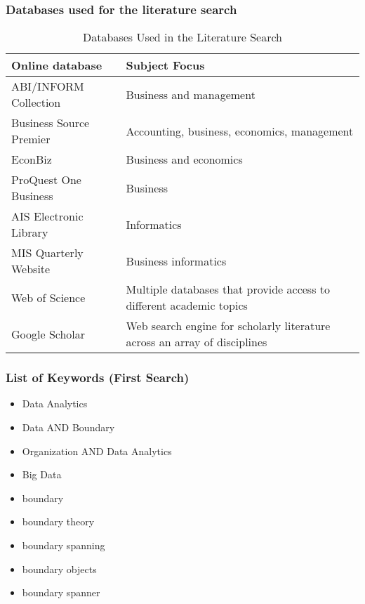\subsubsection*{Databases used for the literature search}

\begin{table}[htbp]
    \centering
    \small
    \begin{tabular}{lL{8cm}}
    \hline
    Online database           & Subject Focus                                                          \\ \hline
    ABI/INFORM Collection     & Business and management                                                \\
    Business Source Premier   & Accounting, business, economics, management                            \\
    EconBiz                   & Business and economics                                                 \\
    ProQuest One Business     & Business                                                               \\
    AIS Electronic Library    & Informatics                                                            \\
    MIS Quarterly Website     & Business informatics                                                   \\
    Web of Science            & Multiple databases that provide access to different academic topics    \\
    Google Scholar            & Web search engine for scholarly literature across an array of disciplines \\ \hline
    \end{tabular}
    \caption{Databases Used in the Literature Search}
    \label{literature_search_db}
    \end{table}
    
\subsubsection*{List of Keywords (First Search)}

\begin{itemize}
    \item Data Analytics
	\item Data AND Boundary
	\item Organization AND Data Analytics
	\item Big Data
	\item boundary 
	\item boundary theory
	\item boundary spanning
	\item boundary objects
    \item boundary spanner
\end{itemize}

